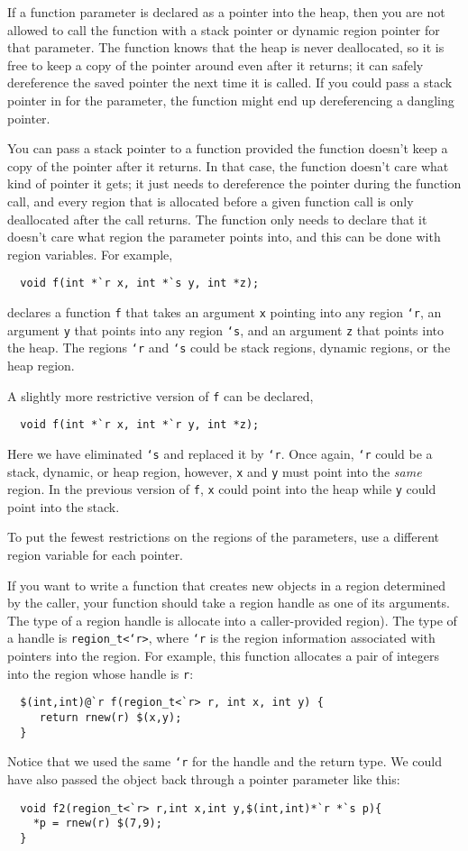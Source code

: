 If a function parameter is declared as a pointer into the heap, then
you are not allowed to call the function with a stack pointer or
dynamic region pointer for that parameter.  The function knows that
the heap is never deallocated, so it is free to keep a copy of the
pointer around even after it returns; it can safely dereference the saved
pointer the next time it is called.  If you could pass a stack pointer
in for the parameter, the function might end up dereferencing a
dangling pointer.

You can pass a stack pointer to a function provided the function
doesn't keep a copy of the pointer after it returns.  In that case,
the function doesn't care what kind of pointer it gets; it just needs
to dereference the pointer during the function call, and every region
that is allocated before a given function call is only deallocated
after the call returns.  The function only needs to declare that it
doesn't care what region the parameter points into, and this can be
done with region variables.  For example,
\begin{verbatim}
  void f(int *`r x, int *`s y, int *z);
\end{verbatim}
declares a function \texttt{f} that takes an argument \texttt{x}
pointing into any region \texttt{`r}, an argument \texttt{y} that
points into any region \texttt{`s}, and an argument \texttt{z} that
points into the heap.  The regions \texttt{`r} and \texttt{`s} could
be stack regions, dynamic regions, or the heap region.

A slightly more restrictive version of \texttt{f} can be declared,
\begin{verbatim}
  void f(int *`r x, int *`r y, int *z);
\end{verbatim}
Here we have eliminated \texttt{`s} and replaced it by \texttt{`r}.
Once again, \texttt{`r} could be a stack, dynamic, or heap region,
however, \texttt{x} and \texttt{y} must point into the \emph{same}
region.  In the previous version of \texttt{f}, \texttt{x} could point
into the heap while \texttt{y} could point into the stack.

To put the fewest restrictions on the regions of the parameters, use a
different region variable for each pointer.

If you want to write a function that creates new objects in a region
determined by the caller, your function should take a region handle as
one of its arguments.  The type of a region handle is allocate into a
caller-provided region).  The type of a handle is
\texttt{region_t<`r>}, where \texttt{`r} is the region information
associated with pointers into the region.  For example, this function
allocates a pair of integers into the region whose handle is
\texttt{r}:
\begin{verbatim}
  $(int,int)@`r f(region_t<`r> r, int x, int y) { 
     return rnew(r) $(x,y);
  }
\end{verbatim}
Notice that we used the same \texttt{`r} for the handle and the return
type.  We could have also passed the object back through a pointer
parameter like this:
\begin{verbatim}
  void f2(region_t<`r> r,int x,int y,$(int,int)*`r *`s p){ 
    *p = rnew(r) $(7,9); 
  }
\end{verbatim}

